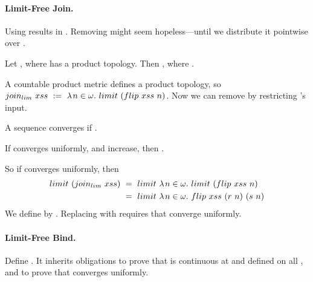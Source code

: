 \paragraph{Limit-Free Join.}
Using  results in .
Removing  might seem hopeless---until we distribute it pointwise over .

\begin{lemma}
Let , where  has a product topology. Then , where .
\end{lemma}

A countable product metric defines a product topology, so $join_{lim}~xss\ :=\ \lambda\mspace{2mu}{n \in \omega}\ldotp\, limit~(flip~xss~n)$. Now we can remove  by restricting 's input.

\begin{definition}
\label{def:uniform-convergence}
A sequence  converges  if
.
\end{definition}

\begin{lemma}
If  converges uniformly, and  increase, then .
\end{lemma}

So if  converges uniformly, then
\begin{equation}
\begin{aligned}
limit~(join_{lim}~xss)
 &\ =\  limit~\lambda\mspace{2mu}{n \in \omega}\ldotp\, limit~(flip~xss~n) \\
 &\ =\  limit~\lambda\mspace{2mu}{n \in \omega}\ldotp\, flip~xss~(r~n)~(s~n)
\end{aligned}
\end{equation}
We define  by . Replacing  with  requires that  converge uniformly.

\paragraph{Limit-Free Bind.}
Define . It inherits obligations to prove that  is continuous at  and defined on all , and to prove that  converges uniformly.

